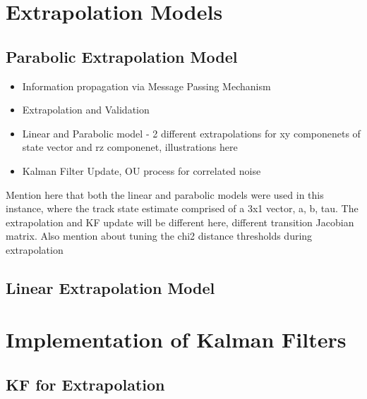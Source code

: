 \section{Extrapolation Models}
\label{chapter-6-extrapolation}



\subsection{Parabolic Extrapolation Model}
\begin{itemize}
    \item Information propagation via Message Passing Mechanism
    \item Extrapolation and Validation
    \item Linear and Parabolic model - 2 different extrapolations for xy componenets of state vector and rz componenet, illustrations here
    \item Kalman Filter Update, OU process for correlated noise
\end{itemize}

Mention here that both the linear and parabolic models were used in this instance, where the track state estimate comprised of a 3x1 vector, a, b, tau. The extrapolation and KF update will be different here, different transition Jacobian matrix. Also mention about tuning the chi2 distance thresholds during extrapolation


\subsection{Linear Extrapolation Model}












\section{Implementation of Kalman Filters}
\label{gnn-kf-implementation}


\subsection{KF for Extrapolation}
\label{kf-for-extrp-chapter-6}

